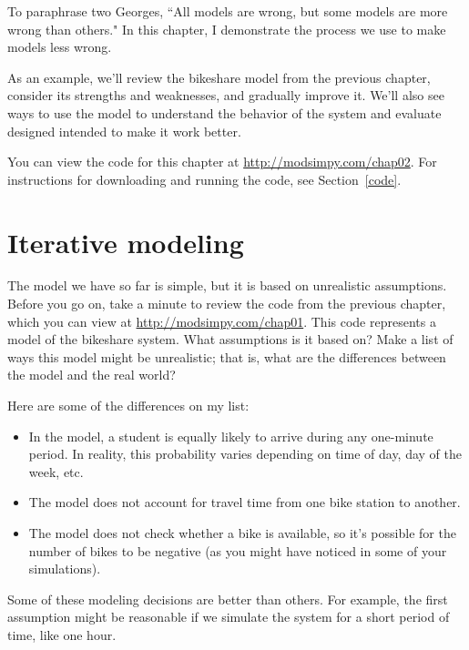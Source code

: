 \documentclass[12pt]{book}
\theoremstyle{exercise}
\begin{document}
To paraphrase two Georges, ``All models are wrong, but some models are more wrong than others."  In this chapter, I demonstrate the process we use to make models less wrong.

As an example, we'll review the bikeshare model from the previous chapter, consider its strengths and weaknesses, and gradually improve it.  We'll also see ways to use the model to understand the behavior of the system and evaluate designed intended to make it work better.

You can view the code for this chapter at \url{http://modsimpy.com/chap02}.  For instructions for downloading and running the code, see Section~\ref{code}.


\section{Iterative modeling}

The model we have so far is simple, but it is based on unrealistic assumptions.  Before you go on, take a minute to review the code from the previous chapter, which you can view at \url{http://modsimpy.com/chap01}.  This code represents a model of the bikeshare system.  What assumptions is it based on?  Make a list of ways this model might be unrealistic; that is, what are the differences between the model and the real world?

Here are some of the differences on my list:

\begin{itemize}

\item In the model, a student is equally likely to arrive during any one-minute period.  In reality, this probability varies depending on time of day, day of the week, etc.

\item The model does not account for travel time from one bike station to another.

\item The model does not check whether a bike is available, so it's possible for the number of bikes to be negative (as you might have noticed in some of your simulations).

\end{itemize}

Some of these modeling decisions are better than others.  For example, the first assumption might be reasonable if we simulate the system for a short period of time, like one hour.
\end{document}
